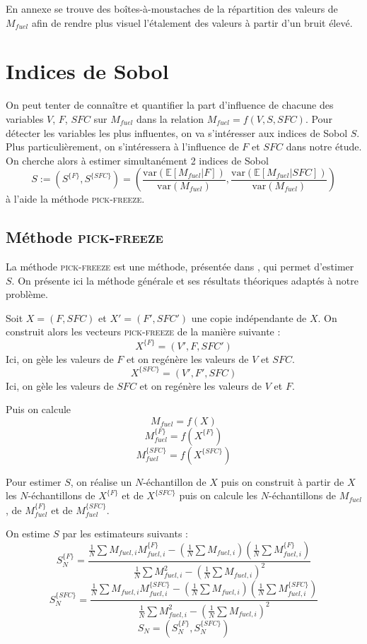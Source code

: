 \documentclass{article}
\begin{document}
En annexe se trouve des boîtes-à-moustaches de la répartition des valeurs de $M_{fuel}$ afin de rendre plus visuel l'étalement des valeurs à partir d'un bruit élevé. 
\section{Indices de Sobol}
On peut tenter de connaître et quantifier la part d'influence de chacune des variables $V$, $F$, $SFC$ sur $M_{fuel}$ dans la relation $M_{fuel}=f(V, S, SFC)$. Pour détecter les variables les plus influentes, on va s'intéresser aux indices de Sobol $S$. Plus particulièrement, on s'intéressera à l'influence de $F$ et $SFC$ dans notre étude. On cherche alors à estimer simultanément 2 indices de Sobol
\[S:=(S^{\{F\}}, S^{\{SFC\}})=\left(\frac{\text{var}(\mathbb{E}[M_{fuel}|F])}{\text{var}(M_{fuel})},\frac{\text{var}(\mathbb{E}[M_{fuel}|SFC])}{\text{var}(M_{fuel})}\right)\]
à l'aide la méthode \textsc{pick-freeze}.
\subsection{Méthode \textsc{pick-freeze}}
La méthode \textsc{pick-freeze} est une méthode, présentée dans \cite{ref2}, qui permet d'estimer $S$. On présente ici la méthode générale et ses résultats théoriques adaptés à notre problème.

Soit $X=(F, SFC)$ et $X'=(F', SFC')$ une copie indépendante de $X$. On construit alors les vecteurs \textsc{pick-freeze} de la manière suivante : 
\[X^{\{F\}}=(V',F, SFC')\]
Ici, on gèle les valeurs de $F$ et on regénère les valeurs de $V$ et $SFC$.
\[X^{\{SFC\}}=(V',F', SFC)\]
Ici, on gèle les valeurs de $SFC$ et on regénère les valeurs de $V$ et $F$.

Puis on calcule
\[M_{fuel}=f(X)\]
\[M_{fuel}^{\{F\}}=f(X^{\{F\}})\]
\[M_{fuel}^{\{SFC\}}=f(X^{\{SFC\}})\]

Pour estimer $S$, on réalise un $N$-échantillon de $X$ puis on construit à partir de $X$ les $N$-échantillons de $X^{\{F\}}$ et de $X^{\{SFC\}}$ puis on calcule les $N$-échantillons de $M_{fuel}$, de $M_{fuel}^{\{F\}}$ et de $M_{fuel}^{\{SFC\}}$. 

On estime $S$ par les estimateurs suivants : 
\[S^{\{F\}}_{N} = \frac{\frac{1}{N}\sum M_{fuel,i}M_{fuel,i}^{\{F\}} - (\frac{1}{N}\sum M_{fuel,i})(\frac{1}{N}\sum M_{fuel,i}^{\{F\}})}{\frac{1}{N}\sum M_{fuel,i}^{2} - (\frac{1}{N}\sum M_{fuel,i})^{2}}\]
\[S^{\{SFC\}}_{N} = \frac{\frac{1}{N}\sum M_{fuel,i}M_{fuel,i}^{\{SFC\}} - (\frac{1}{N}\sum M_{fuel,i})(\frac{1}{N}\sum M_{fuel,i}^{\{SFC\}})}{\frac{1}{N}\sum M_{fuel,i}^{2} - (\frac{1}{N}\sum M_{fuel,i})^{2}}\]
\[S_N=\left(S^{\{F\}}_{N}, S^{\{SFC\}}_{N}\right)\]
\end{document}

